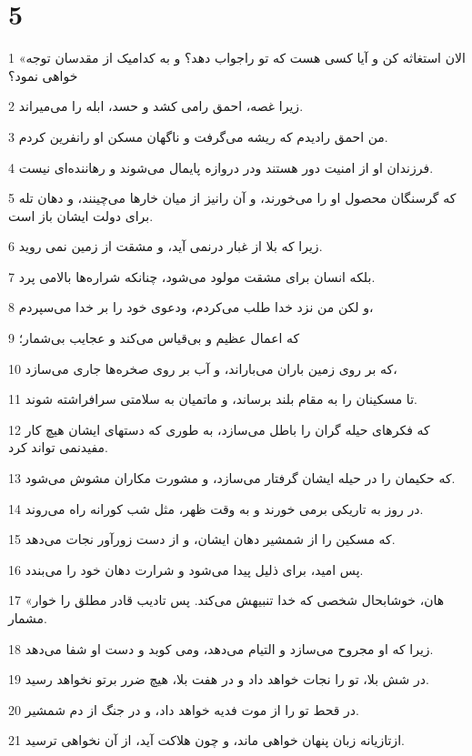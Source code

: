 \chapter{5}

\par 1 «الان استغاثه کن و آیا کسی هست که تو راجواب دهد؟ و به کدامیک از مقدسان توجه خواهی نمود؟
\par 2 زیرا غصه، احمق رامی کشد و حسد، ابله را می‌میراند.
\par 3 من احمق رادیدم که ریشه می‌گرفت و ناگهان مسکن او رانفرین کردم.
\par 4 فرزندان او از امنیت دور هستند ودر دروازه پایمال می‌شوند و رهاننده‌ای نیست.
\par 5 که گرسنگان محصول او را می‌خورند، و آن رانیز از میان خارها می‌چینند، و دهان تله برای دولت ایشان باز است.
\par 6 زیرا که بلا از غبار درنمی آید، و مشقت از زمین نمی روید.
\par 7 بلکه انسان برای مشقت مولود می‌شود، چنانکه شراره‌ها بالامی پرد.
\par 8 و لکن من نزد خدا طلب می‌کردم، ودعوی خود را بر خدا می‌سپردم،
\par 9 که اعمال عظیم و بی‌قیاس می‌کند و عجایب بی‌شمار؛
\par 10 که بر روی زمین باران می‌باراند، و آب بر روی صخره‌ها جاری می‌سازد،
\par 11 تا مسکینان را به مقام بلند برساند، و ماتمیان به سلامتی سرافراشته شوند.
\par 12 که فکرهای حیله گران را باطل می‌سازد، به طوری که دستهای ایشان هیچ کار مفیدنمی تواند کرد.
\par 13 که حکیمان را در حیله ایشان گرفتار می‌سازد، و مشورت مکاران مشوش می‌شود.
\par 14 در روز به تاریکی برمی خورند و به وقت ظهر، مثل شب کورانه راه می‌روند.
\par 15 که مسکین را از شمشیر دهان ایشان، و از دست زورآور نجات می‌دهد.
\par 16 پس امید، برای ذلیل پیدا می‌شود و شرارت دهان خود را می‌بندد.
\par 17 «هان، خوشابحال شخصی که خدا تنبیهش می‌کند. پس تادیب قادر مطلق را خوار مشمار.
\par 18 زیرا که او مجروح می‌سازد و التیام می‌دهد، ومی کوبد و دست او شفا می‌دهد.
\par 19 در شش بلا، تو را نجات خواهد داد و در هفت بلا، هیچ ضرر برتو نخواهد رسید.
\par 20 در قحط تو را از موت فدیه خواهد داد، و در جنگ از دم شمشیر.
\par 21 ازتازیانه زبان پنهان خواهی ماند، و چون هلاکت آید، از آن نخواهی ترسید.

